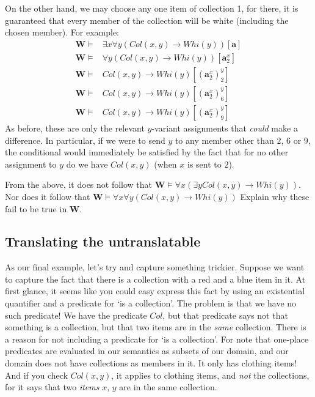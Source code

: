 On the other hand, we may choose any one item of collection 1, for there, it is guaranteed that every member of the collection will be white (including the chosen member). For example:
%
\begin{align*}
	\mathbf{W} \models& \exists x\forall y(Col(x, y) \rightarrow Whi(y))[\mathbf{a}]\\
	\mathbf{W} \models& \forall y(Col(x, y) \rightarrow Whi(y))[\mathbf{a}^x_2]\\
	\mathbf{W} \models& Col(x, y) \rightarrow Whi(y)[(\mathbf{a}^x_2)^y_2]\\
	\mathbf{W} \models& Col(x, y) \rightarrow Whi(y)[(\mathbf{a}^x_2)^y_6]\\
		\mathbf{W} \models& Col(x, y) \rightarrow Whi(y)[(\mathbf{a}^x_2)^y_9]
\end{align*} 
%
As before, these are only the relevant $y$-variant assignments that \textit{could} make a difference. In particular, if we were to send $y$ to any member other than $2$, $6$ or $9$, the conditional would immediately be satisfied by the fact that for no other assignment to $y$ do we have $Col(x, y)$ (when $x$ is sent to $2$).

\begin{exc}
From the above, it does not follow that $\mathbf{W} \models \forall x(\exists y Col(x, y) \rightarrow Whi(y))$. Nor does it follow that $\mathbf{W} \models \forall x \forall y(Col(x, y) \rightarrow Whi(y))$  Explain why these fail to be true in $\mathbf{W}$.
\end{exc}

\subsection{Translating the untranslatable}

As our final example, let's try and capture something trickier. Suppose we want to capture the fact that there is a collection with a red and a blue item in it. At first glance, it seems like you could easy express this fact by using an existential quantifier and a predicate for `is a collection'. The problem is that we have no such predicate! We have the predicate $Col$, but that predicate says not that something is a collection, but that two items are in the \textit{same} collection. There is a reason for not including a predicate for `is a collection'. For note that one-place predicates are evaluated in our semantics as subsets of our domain, and our domain does not have collections as members in it. It only has clothing items! And if you check $Col(x, y)$, it applies to clothing items, and \textit{not} the collections, for it says that two \textit{items} $x$, $y$ are in the same collection.

